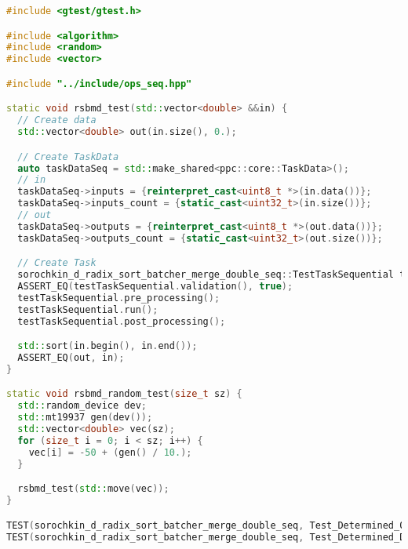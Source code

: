 \documentclass[12pt]{article}
\begin{document}
\begin{lstlisting}[language=C++, caption={Код алгоритма}]
#include <gtest/gtest.h>

#include <algorithm>
#include <random>
#include <vector>

#include "../include/ops_seq.hpp"

static void rsbmd_test(std::vector<double> &&in) {
  // Create data
  std::vector<double> out(in.size(), 0.);

  // Create TaskData
  auto taskDataSeq = std::make_shared<ppc::core::TaskData>();
  // in
  taskDataSeq->inputs = {reinterpret_cast<uint8_t *>(in.data())};
  taskDataSeq->inputs_count = {static_cast<uint32_t>(in.size())};
  // out
  taskDataSeq->outputs = {reinterpret_cast<uint8_t *>(out.data())};
  taskDataSeq->outputs_count = {static_cast<uint32_t>(out.size())};

  // Create Task
  sorochkin_d_radix_sort_batcher_merge_double_seq::TestTaskSequential testTaskSequential(taskDataSeq);
  ASSERT_EQ(testTaskSequential.validation(), true);
  testTaskSequential.pre_processing();
  testTaskSequential.run();
  testTaskSequential.post_processing();

  std::sort(in.begin(), in.end());
  ASSERT_EQ(out, in);
}

static void rsbmd_random_test(size_t sz) {
  std::random_device dev;
  std::mt19937 gen(dev());
  std::vector<double> vec(sz);
  for (size_t i = 0; i < sz; i++) {
    vec[i] = -50 + (gen() / 10.);
  }

  rsbmd_test(std::move(vec));
}

TEST(sorochkin_d_radix_sort_batcher_merge_double_seq, Test_Determined_0) { rsbmd_test({}); }
TEST(sorochkin_d_radix_sort_batcher_merge_double_seq, Test_Determined_Diff) { rsbmd_test({4e5 + 8, 2e-4 - 4, 1e-10}); }


\end{lstlisting}
\end{document}
